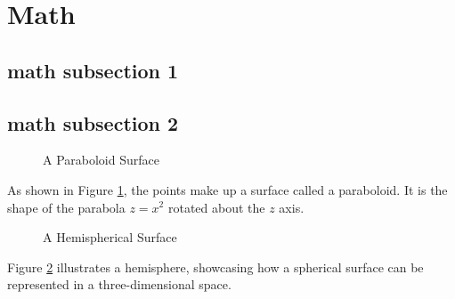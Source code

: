 \section{Math}

\subsection{math subsection 1}
\lipsum[1]

\subsection{math subsection 2}
\begin{figure}[htbp]
\centering
{}
\caption{A Paraboloid Surface}
\label{fig:paraboloid}
\end{figure}

As shown in Figure \ref{fig:paraboloid}, the points make up a surface called a paraboloid. It is the shape of the parabola \( z = x^2 \) rotated about the \( z \) axis.

\begin{figure}[h]
\centering
{}
\caption{A Hemispherical Surface}
\label{fig:hemisphere}
\end{figure}

Figure \ref{fig:hemisphere} illustrates a hemisphere, showcasing how a spherical surface can be represented in a three-dimensional space.
